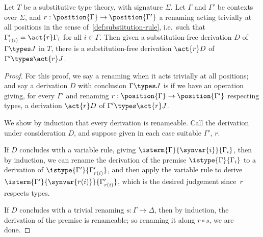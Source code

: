 \begin{lemma}
  \label{lem:admissibility-renaming}%
  Let $T$ be a substitutive type theory, with signature $\Sigma$.
  Let $\Gamma$ and $\Gamma'$ be contexts over $\Sigma$, and $r : \position{\Gamma} \to \position{\Gamma'}$ a renaming acting trivially at all positions in the sense of~\cref{def:substitution-rule}, i.e.\ such that $\Gamma'_{r(i)} = \act{r}\Gamma_i$ for all $i \in \Gamma$.
  Then given a substitution-free derivation $D$ of $\Gamma \types J$ in $T$, there is a substitution-free derivation $\act{r}D$ of $\Gamma' \types \act{r} J$.
\end{lemma}

\begin{proof}
  For this proof, we say a renaming  when it acts trivially at all positions; and say a derivation $D$ with conclusion $\Gamma \types J$ is  if we have an operation giving, for every $\Gamma'$ and renaming $r : \position{\Gamma} \to \position{\Gamma'}$ respecting types, a derivation $\act{r}D$ of $\Gamma' \types \act{r} J$.
  
  We show by induction that every derivation is renameable.
  Call the derivation under consideration $D$, and suppose given in each case suitable $\Gamma'$, $r$.
  
  If $D$ concludes with a variable rule, giving $\isterm{\Gamma}{\synvar{i}}{\Gamma_i}$, then by induction, we can rename the derivation of the premise ${\istype{\Gamma}{\Gamma_i}}$ to a derivation of $\istype{\Gamma'}{\Gamma'_{r(i)}}$,
  and then apply the variable rule to derive $\isterm{\Gamma'}{\synvar{r(i)}}{\Gamma'_{r(i)}}$, which is the desired judgement since~$r$ respects types.

  If $D$ concludes with a trivial renaming $s : \Gamma \to \Delta$,
  then by induction, the derivation of the premise is renameable; so renaming it along $r \circ s$, we are done.


\end{proof}
